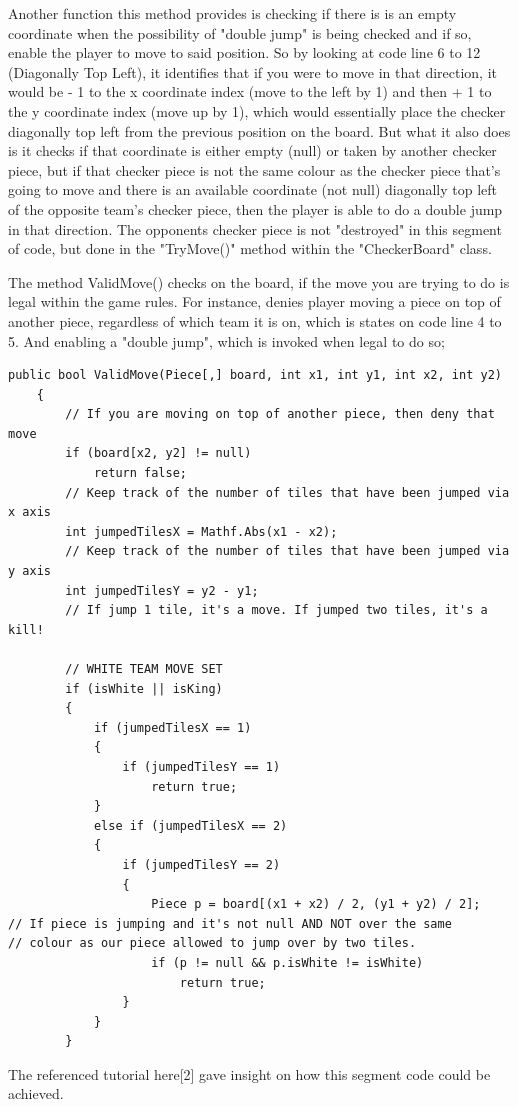 \documentclass[10pt, a4paper]{article}
\begin{document}
	Another function this method provides is checking if there is is an empty coordinate when the possibility of "double jump" is being checked and if so, enable the player to move to said position. So by looking at code line 6 to 12 (Diagonally Top Left), it identifies that if you were to move in that direction, it would be - 1 to the x coordinate index (move to the left by 1) and then + 1 to the y coordinate index (move up by 1), which would essentially place the checker diagonally top left from the previous position on the board. But what it also does is it checks if that coordinate is either empty (null) or taken by another checker piece, but if that checker piece is not the same colour as the checker piece that's going to move and there is an available coordinate (not null) diagonally top left of the opposite team's checker piece, then the player is able to do a double jump in that direction. The opponents checker piece is not "destroyed" in this segment of code, but done in the "TryMove()" method within the "CheckerBoard" class.
	
	The method ValidMove() checks on the board, if the move you are trying to do is legal within the game rules. For instance, denies player moving a piece on top of another piece, regardless of which team it is on, which is states on code line 4 to 5. And enabling a "double jump", which is invoked when legal to do so;
	
	\begin{lstlisting}[caption = ValidMove()]
	 public bool ValidMove(Piece[,] board, int x1, int y1, int x2, int y2)
    {
        // If you are moving on top of another piece, then deny that move
        if (board[x2, y2] != null)
            return false;
        // Keep track of the number of tiles that have been jumped via x axis
        int jumpedTilesX = Mathf.Abs(x1 - x2);
        // Keep track of the number of tiles that have been jumped via y axis
        int jumpedTilesY = y2 - y1;
        // If jump 1 tile, it's a move. If jumped two tiles, it's a kill!
        
        // WHITE TEAM MOVE SET
        if (isWhite || isKing)
        {
            if (jumpedTilesX == 1)
            {
                if (jumpedTilesY == 1)
                    return true;
            }
            else if (jumpedTilesX == 2)
            {
                if (jumpedTilesY == 2)
                {
                    Piece p = board[(x1 + x2) / 2, (y1 + y2) / 2];
// If piece is jumping and it's not null AND NOT over the same
// colour as our piece allowed to jump over by two tiles.
                    if (p != null && p.isWhite != isWhite)
                        return true;
                }
            }
        }
	\end{lstlisting}
	The referenced tutorial here[2] gave insight on how this segment code could be achieved.
	
\end{document}
